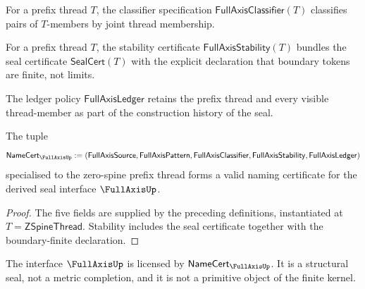 \begin{definition}
\label{def:fullaxis-classifier-specification}
For a prefix thread \(T\), the classifier specification \(\mathsf{FullAxisClassifier}(T)\) classifies pairs of \(T\)-members by joint thread membership.
\end{definition}

\begin{definition}
\label{def:fullaxis-stability-certificate}
For a prefix thread \(T\), the stability certificate \(\mathsf{FullAxisStability}(T)\) bundles the seal certificate \(\mathsf{SealCert}(T)\) with the explicit declaration that boundary tokens are finite, not limits.
\end{definition}

\begin{definition}
\label{def:fullaxis-ledger-policy}
The ledger policy \(\mathsf{FullAxisLedger}\) retains the prefix thread and every visible thread-member as part of the construction history of the seal.
\end{definition}

\begin{theorem}
\label{thm:concrete-fullaxis-namecert}
The tuple
$$
  \mathsf{NameCert}_{\FullAxisUp}
  :=
  (\mathsf{FullAxisSource},
   \mathsf{FullAxisPattern},
   \mathsf{FullAxisClassifier},
   \mathsf{FullAxisStability},
   \mathsf{FullAxisLedger})
$$
specialised to the zero-spine prefix thread forms a valid naming certificate for the derived seal interface \(\FullAxisUp\).
\end{theorem}
\begin{proof}
The five fields are supplied by the preceding definitions, instantiated at \(T = \mathsf{ZSpineThread}\). Stability includes the seal certificate together with the boundary-finite declaration.
\end{proof}

\begin{corollary}
\label{cor:fullaxis-licensed-not-primitive}
The interface \(\FullAxisUp\) is licensed by \(\mathsf{NameCert}_{\FullAxisUp}\). It is a structural seal, not a metric completion, and it is not a primitive object of the finite kernel.
\end{corollary}

